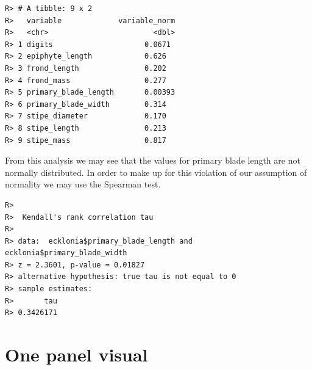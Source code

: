 \documentclass[english,10pt,a4paper,oneside]{book}
\newenvironment{Shaded}{\begin{snugshade}}{\end{snugshade}}
\newcommand{\KeywordTok}[1]{\textcolor[rgb]{0.13,0.29,0.53}{\textbf{#1}}}
\newcommand{\DataTypeTok}[1]{\textcolor[rgb]{0.13,0.29,0.53}{#1}}
\newcommand{\DecValTok}[1]{\textcolor[rgb]{0.00,0.00,0.81}{#1}}
\newcommand{\StringTok}[1]{\textcolor[rgb]{0.31,0.60,0.02}{#1}}
\newcommand{\OperatorTok}[1]{\textcolor[rgb]{0.81,0.36,0.00}{\textbf{#1}}}
\newcommand{\NormalTok}[1]{#1}
\theoremstyle{definition}
\theoremstyle{definition}
\theoremstyle{definition}
\theoremstyle{remark}
\begin{document}
\begin{Shaded}
\end{Shaded}

\begin{verbatim}
R> # A tibble: 9 x 2
R>   variable             variable_norm
R>   <chr>                        <dbl>
R> 1 digits                     0.0671 
R> 2 epiphyte_length            0.626  
R> 3 frond_length               0.202  
R> 4 frond_mass                 0.277  
R> 5 primary_blade_length       0.00393
R> 6 primary_blade_width        0.314  
R> 7 stipe_diameter             0.170  
R> 8 stipe_length               0.213  
R> 9 stipe_mass                 0.817
\end{verbatim}

From this analysis we may see that the values for primary blade length
are not normally distributed. In order to make up for this violation of
our assumption of normality we may use the Spearman test.

\begin{Shaded}
\end{Shaded}

\begin{verbatim}
R> 
R>  Kendall's rank correlation tau
R> 
R> data:  ecklonia$primary_blade_length and ecklonia$primary_blade_width
R> z = 2.3601, p-value = 0.01827
R> alternative hypothesis: true tau is not equal to 0
R> sample estimates:
R>       tau 
R> 0.3426171
\end{verbatim}

\section{One panel visual}\label{one-panel-visual}
\end{document}
